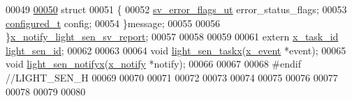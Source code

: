 \begin{DoxyCode}
00049 
\hypertarget{a00018_source_l00050}{}\hyperlink{a00018}{00050}     \textcolor{keyword}{struct}
00051     \{
00052       \hyperlink{a00022_d2/d5a/a00792}{sv\_error\_flags\_ut}      error\_status\_flags;
00053       \hyperlink{a00021_d6/d9c/a00352}{configured\_t}           config;
00054     \}message;
00055 
00056 \}\hyperlink{a00018_d0/d66/a00858}{x\_notify\_light\_sen\_sv\_report};
00057 
00058 
00059 
00061 \textcolor{keyword}{extern} \hyperlink{a00036_ad5c3c5fbfd3e4aadf22830395484a71d}{x\_task\_id} \hyperlink{a00018_a757e7771170ace1d9f8519bd318ec64a}{light\_sen\_id};
00062 
00063 
00064 \textcolor{keywordtype}{void} \hyperlink{a00018_ae9aa2f8b8e90a92755efbcd161c67bc0}{light\_sen\_taskx}(\hyperlink{a00036_de/d37/a00849}{x\_event} *event);
00065 \textcolor{keywordtype}{void} \hyperlink{a00018_a317b03892739257278fd51ab8003962d}{light\_sen\_notifyx}(\hyperlink{a00036_df/d4c/a00851}{x\_notify} *notify);
00066 
00067 
00068 \textcolor{preprocessor}{#endif   //LIGHT\_SEN\_H}
00069 
00070 
00071 
00072 
00073 
00074 
00075 
00076 
00077 
00078 
00079 
00080 
\end{DoxyCode}
